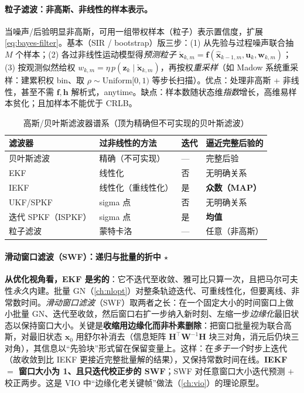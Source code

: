 \paragraph{粒子滤波：非高斯、非线性的样本表示。}
当噪声/后验明显非高斯，可用一组带权样本（粒子）表示置信度，扩展 \cref{eq:bayes-filter}\cite{barfoot2024state}。基本（SIR / bootstrap）版三步：(1) 从先验与过程噪声联合抽 $M$ 个样本；(2) 各过非线性运动模型得\emph{预测粒子} $\check{\mathbf{x}}_{k,m}=\mathbf{f}(\hat{\mathbf{x}}_{k-1,m},\mathbf{u}_k,\mathbf{w}_{k,m})$；(3) 按观测似然给权 $w_{k,m}=\eta\,p(\mathbf{z}_k\mid\check{\mathbf{x}}_{k,m})$，再按权\emph{重采样}（如 Madow 系统重采样：建累积权 bin、取 $\rho\sim\mathrm{Uniform}[0,1)$ 等步长扫描）。优点：处理非高斯 + 非线性，甚至不需 $\mathbf{f},\mathbf{h}$ 解析式，anytime。缺点：样本数随状态维\emph{指数}增长，高维易样本贫化；且加样本不能优于 CRLB。

\begin{table}[ht]\centering\small
\caption{高斯/贝叶斯滤波器谱系（顶为精确但不可实现的贝叶斯滤波）}
\label{tab:filter-taxo}
\begin{tabular}{llll}
\toprule
滤波器 & 过非线性的方法 & 迭代 & 逼近完整后验的 \\
\midrule
贝叶斯滤波 & 精确（不可实现） & — & 完整后验 \\
EKF & 线性化 & 否 & 无明确关系 \\
IEKF & 线性化（重线性化） & 是 & \textbf{众数（MAP）} \\
UKF/SPKF & sigma 点 & 否 & 无明确关系 \\
迭代 SPKF（ISPKF） & sigma 点 & 是 & \textbf{均值} \\
粒子滤波 & 蒙特卡洛 & — & 任意（非高斯） \\
\bottomrule
\end{tabular}
\end{table}

\paragraph{滑动窗口滤波（SWF）：递归与批量的折中 \texorpdfstring{$\star$}{(选读)}}\label{par:swf}
\textbf{从优化视角看，EKF 是劣的}：它不迭代至收敛、雅可比只算一次，且把马尔可夫性\emph{永久}内建。批量 GN（\cref{ch:nlopt}）对整条轨迹迭代、可重线性化，但要离线、非常数时间。\emph{滑动窗口滤波}（SWF\cite{barfoot2024state}）取两者之长：在一个固定大小的时间窗口上做小批量 GN、迭代至收敛，然后窗口右扩一步纳入新时刻、左缩一步\emph{边缘化}最旧状态以保持窗口大小。关键是\textbf{收缩用边缘化而非朴素删除}：把窗口批量视为联合高斯，对最旧状态 $\mathbf{x}_0$ 用舒尔补消去（信息矩阵 $\mathbf{H}^\top\mathbf{W}^{-1}\mathbf{H}$ 块三对角，消元后仍块三对角），其信息以“先验块”形式留在保留变量上。这样：在\emph{多于一个}时步上迭代（故收敛到比 IEKF 更接近完整批量解的结果），又保持常数时间在线。\textbf{IEKF $=$ 窗口大小为 1、且只迭代校正步的 SWF}；SWF 对任意窗口大小迭代预测 $+$ 校正两步。这是 VIO 中“边缘化老关键帧”做法（\cref{ch:vio}）的理论原型。

